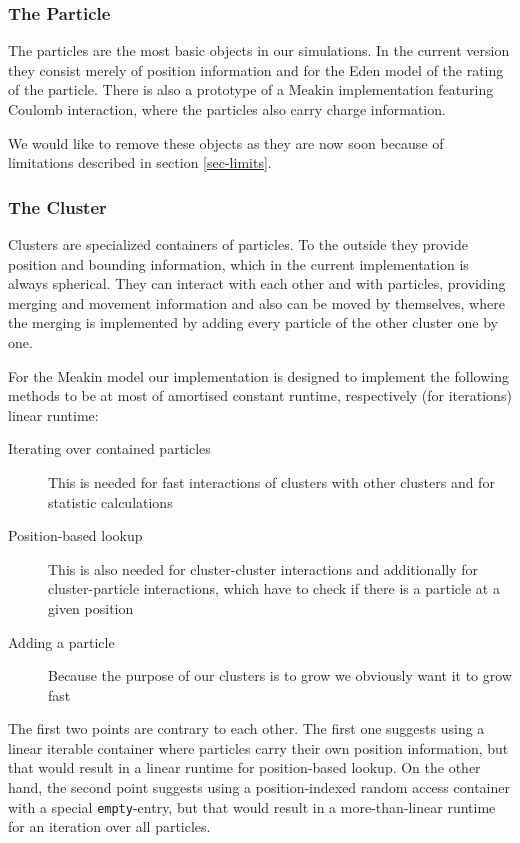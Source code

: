 \documentclass[twocolumn, 10pt]{scrartcl}
\begin{document}
            \subsubsection{The Particle}
                The particles are the most basic objects in our simulations. In the current version they consist merely
                of position information and for the Eden model of the rating of the particle. There is also a
                prototype of a Meakin implementation featuring Coulomb interaction, where the particles also carry
                charge information.

                We would like to remove these objects as they are now soon because of limitations described in section
                \ref{sec-limits}.

            \subsubsection{The Cluster}
                Clusters are specialized containers of particles. To the outside they provide position and bounding
                information, which in the current implementation is always spherical. They can interact with each other
                and with particles, providing merging and movement information and also can be moved by themselves,
                where the merging is implemented by adding every particle of the other cluster one by one.
            
                For the Meakin model our implementation is designed to implement the following methods to be at most
                of amortised constant runtime, respectively (for iterations) linear runtime:
                \begin{description}
                    \item[Iterating over contained particles] This is needed for fast interactions of clusters with
                        other clusters and for statistic calculations
                    \item[Position-based lookup] This is also needed for cluster-cluster interactions and additionally
                        for cluster-particle interactions, which have to check if there is a particle at a given
                        position
                    \item[Adding a particle] Because the purpose of our clusters is to grow we obviously want it to grow
                        fast
                \end{description}
                The first two points are contrary to each other. The first one suggests using a linear iterable
                container where particles carry their own position information, but that would result in a linear
                runtime for position-based lookup. On the other hand, the second point suggests using a position-indexed
                random access container with a special \lstinline'empty'-entry, but that would result in a
                more-than-linear runtime for an iteration over all particles.
\end{document}
